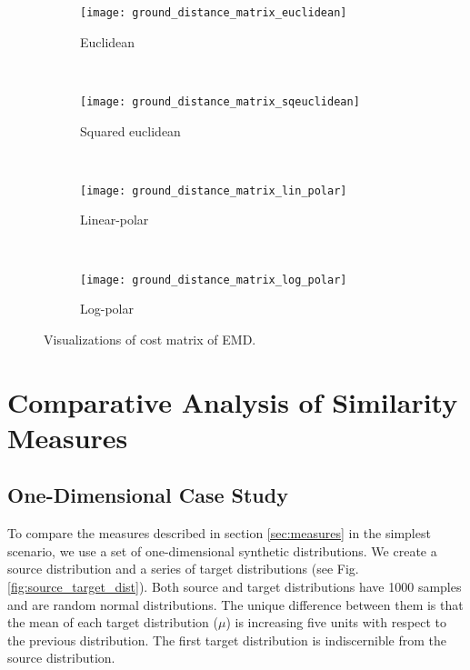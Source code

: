 \begin{figure}[!ht]
    \centering
    \begin{subfigure}[b]{0.47\textwidth}
		\texttt{[image: ground\_distance\_matrix\_euclidean]}	
		\caption{Euclidean}
        \label{fig:ground_distance_matrix_euclidean}
	\end{subfigure}
	~ %
    \begin{subfigure}[b]{0.47\textwidth}
		\texttt{[image: ground\_distance\_matrix\_sqeuclidean]}	
		\caption{Squared euclidean}
        \label{fig:ground_distance_matrix_sqeuclidean}
	\end{subfigure} \\[2ex]
    
    \begin{subfigure}[b]{0.47\textwidth}
		\texttt{[image: ground\_distance\_matrix\_lin\_polar]}	
		\caption{Linear-polar}
        \label{fig:ground_distance_matrix_lin_polar}
	\end{subfigure}  
	~ %
	\begin{subfigure}[b]{0.47\textwidth}
		\texttt{[image: ground\_distance\_matrix\_log\_polar]}	
		\caption{Log-polar}
        \label{fig:ground_distance_matrix_log_polar}
	\end{subfigure}  
	   
   \caption{Visualizations of cost matrix of EMD.}
   \label{fig:EMD_ground_distance_matrix}
\end{figure}


\section{Comparative Analysis of Similarity Measures}\label{sec:comparison}

\subsection{One-Dimensional Case Study}\label{subsec:1d_case}
To compare the measures described in section \ref{sec:measures} in the simplest scenario, we use a set of one-dimensional synthetic distributions. We create a source distribution and a series of target distributions (see Fig. \ref{fig:source_target_dist}). Both source and target distributions have 1000 samples and are random normal distributions. The unique difference between them is that the mean of each target distribution ($\mu$) is increasing five units with respect to the previous distribution. The first target distribution is indiscernible from the source distribution.

